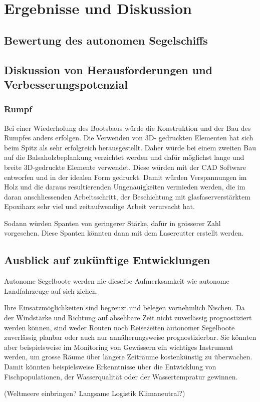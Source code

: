 

\chapter{Ergebnisse und Diskussion }
\label{chap:diskussion}

\section{Bewertung des autonomen Segelschiffs}

\section{Diskussion von Herausforderungen und Verbesserungspotenzial}
\subsection{Rumpf}
Bei einer Wiederholung des Bootsbaus würde die Konstruktion und der Bau des Rumpfes anders erfolgen. Die Verwenden von 3D- gedruckten Elementen hat sich beim Spitz als sehr erfolgreich herausgestellt. Daher würde bei einem zweiten Bau auf die Balsaholzbeplankung verzichtet werden und dafür möglichst lange und breite 3D-gedruckte Elemente verwendet. Diese würden mit der CAD Software entworfen und in der idealen Form gedruckt. Damit  würden Verspannungen im Holz und die daraus resultierenden Ungenauigkeiten  vermieden werden, die im daran anschliessenden Arbeitsschritt, der Beschichtung mit glasfaserverstärktem Epoxiharz sehr viel und zeitaufwendige Arbeit verursacht hat.

Sodann würden Spanten von geringerer Stärke, dafür in grösserer Zahl vorgesehen. Diese Spanten könnten dann mit dem Lasercutter erstellt werden.  

\section{Ausblick auf zukünftige Entwicklungen}
Autonome Segelboote werden nie dieselbe Aufmerksamkeit wie autonome Landfahrzeuge auf sich ziehen. 

Ihre Einsatzmöglichkeiten sind begrenzt und belegen vornehmlich Nischen. Da der Windstärke und Richtung auf absehbare Zeit nicht zuverlässig prognostiziert werden können, sind weder Routen noch Reisezeiten autonomer Segelboote zuverlässig planbar oder auch nur annäherungsweise prognostizierbar. Sie könnten aber beispielsweise im Monitoring von Gewässern ein wichtiges Instrument werden, um grosse Räume über  längere Zeiträume kostenkünstig zu überwachen. Damit könnten beispielsweise Erkenntnisse über die Entwicklung von  Fischpopulationen, der Wasserqualität oder der Wassertempratur  gewinnen.

(Weltmeere einbringen? Langsame Logistik Klimaneutral?)
